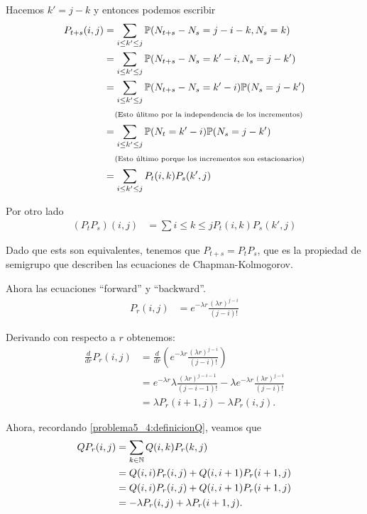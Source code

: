 Hacemos $k' = j - k$ y entonces podemos escribir
\begin{align}
    P_{t+s}(i,j)    &=  \sum_{i \leq k' \leq j}\mathbb{P}(N_{t+s} - N_s = j-i-k, N_s = k)               \\    
                    &=  \sum_{i \leq k' \leq j}\mathbb{P}(N_{t+s} - N_s = k' - i, N_s = j - k')         \\    
                    &=  \sum_{i \leq k' \leq j}\mathbb{P}(N_{t+s} - N_s = k' - i)\mathbb{P}(N_s = j - k')       \\
                    &\;\;\;\;\mbox{{\scriptsize(Esto úlitmo por la independencia de los incrementos)}}              \\
                    &=  \sum_{i \leq k' \leq j}\mathbb{P}(N_{t} = k' - i)\mathbb{P}(N_s = j - k')               \\
                    &\;\;\;\;\mbox{{\scriptsize(Esto último porque los incrementos son estacionarios)}}             \\
                    &=  \sum_{i \leq k' \leq j} P_t(i,k) P_s(k',j)                              \\
\end{align}

Por otro lado
\begin{align}
    (P_t P_s)(i,j)  &=  \sum{i \leq k \leq j}   P_t(i,k) P_s(k',j)
\end{align}

Dado que ests son equivalentes, tenemos que $P_{t+s} = P_t P_s$, que es la propiedad de semigrupo que describen
las ecuaciones de Chapman-Kolmogorov.\pn

Ahora las ecuaciones ``forward'' y ``backward''.
\begin{align}
    P_r(i, j)   &=  e^{-\lambda r}   \frac{(\lambda r)^{j - i}}{(j - i)!}
\end{align}\pn

Derivando con respecto a $r$ obtenemos:
\begin{align}
    \frac{d}{dr}    P_r(i, j)   &=  \frac{d}{dr} \left( e^{-\lambda r}   \frac{(\lambda r)^{j - i}}{(j - i)!}   \right)                                                         \\
                                &=  e^{-\lambda r} \lambda \frac{(\lambda r)^{j - i - 1 }}{(j - i - 1)!} -\lambda e^{-\lambda r}   \frac{(\lambda r)^{j - i}}{(j - i)!}         \\
                                &=  \lambda P_r(i+1, j) - \lambda P_r(i,j).
\end{align}\pn

Ahora, recordando \eqref{problema5_4:definicionQ}, veamos que
\begin{align}
     QP_r(i,j)  &= \sum_{k \in \mathbb{N}} Q(i,k)P_r(k,j)           \\
                &= Q(i,i)P_r(i,j)   + Q(i, i+1)P_r(i+1,j)   \\
                &= Q(i,i)P_r(i,j)   + Q(i, i+1)P_r(i+1,j)   \\
                &=  -\lambda P_r(i,j) + \lambda P_r(i+1,j).
\end{align}\pn

